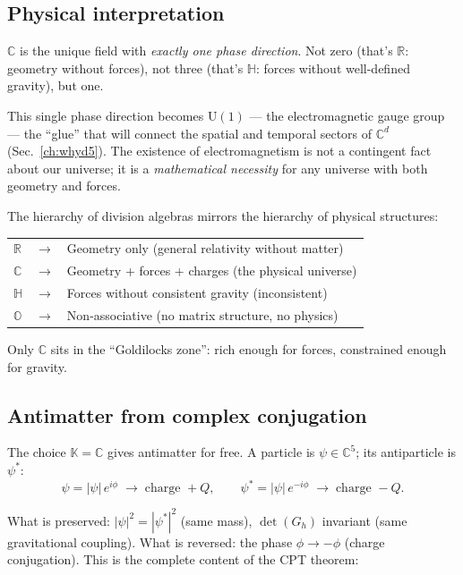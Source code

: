 \subsection{Physical interpretation}

$\mathbb{C}$ is the unique field with \emph{exactly one phase direction}. Not zero (that's $\mathbb{R}$: geometry without forces), not three (that's $\mathbb{H}$: forces without well-defined gravity), but one.

This single phase direction becomes $\text{U}(1)$ --- the electromagnetic gauge group --- the ``glue'' that will connect the spatial and temporal sectors of $\mathbb{C}^d$ (Sec.~\ref{ch:whyd5}). The existence of electromagnetism is not a contingent fact about our universe; it is a \emph{mathematical necessity} for any universe with both geometry and forces.

\begin{remark}
The hierarchy of division algebras mirrors the hierarchy of physical structures:
\begin{center}
\begin{tabular}{lcl}
$\mathbb{R}$ & $\to$ & Geometry only (general relativity without matter) \\
$\mathbb{C}$ & $\to$ & Geometry + forces + charges (the physical universe) \\
$\mathbb{H}$ & $\to$ & Forces without consistent gravity (inconsistent) \\
$\mathbb{O}$ & $\to$ & Non-associative (no matrix structure, no physics)
\end{tabular}
\end{center}
Only $\mathbb{C}$ sits in the ``Goldilocks zone'': rich enough for forces, constrained enough for gravity.
\end{remark}

\subsection{Antimatter from complex conjugation}

The choice $\mathbb{K} = \mathbb{C}$ gives antimatter for free. A particle is $\psi \in \mathbb{C}^5$; its antiparticle is $\psi^*$:
\begin{equation}
\psi = |\psi|\,e^{i\phi} \;\to\; \text{charge } +Q, \qquad \psi^* = |\psi|\,e^{-i\phi} \;\to\; \text{charge } -Q.
\end{equation}

What is preserved: $|\psi|^2 = |\psi^*|^2$ (same mass), $\det(G_h)$ invariant (same gravitational coupling). What is reversed: the phase $\phi \to -\phi$ (charge conjugation). This is the complete content of the CPT theorem:

